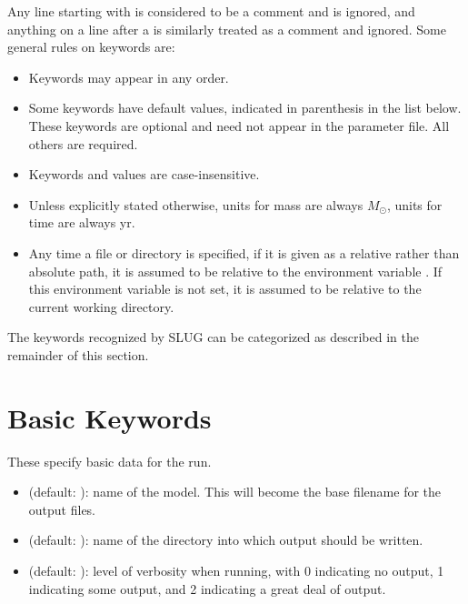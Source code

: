 \documentclass[letterpaper,10pt,english]{sphinxmanual}
\begin{document}
Any line starting with \code{\#} is considered to be a comment and is ignored, and anything on a line after a \code{\#} is similarly treated as a comment and ignored. Some general rules on keywords are:
\begin{itemize}
\item {} 
Keywords may appear in any order.

\item {} 
Some keywords have default values, indicated in parenthesis in the list below. These keywords are optional and need not appear in the parameter file. All others are required.

\item {} 
Keywords and values are case-insensitive.

\item {} 
Unless explicitly stated otherwise, units for mass are always \(M_\odot\), units for time are always yr.

\item {} 
Any time a file or directory is specified, if it is given as a relative rather than absolute path, it is assumed to be relative to the environment variable . If this environment variable is not set, it is assumed to be relative to the current working directory.

\end{itemize}

The keywords recognized by SLUG can be categorized as described in the remainder of this section.


\section{Basic Keywords}
\label{parameters:basic-keywords}\label{parameters:ssec-basic-keywords}
These specify basic data for the run.
\begin{itemize}
\item {} 
 (default: ): name of the model. This will become the base filename for the output files.

\item {} 
 (default: ): name of the directory into which output should be written.

\item {} 
 (default: ): level of verbosity when running, with 0 indicating no output, 1 indicating some output, and 2 indicating a great deal of output.

\end{itemize}
\end{document}
